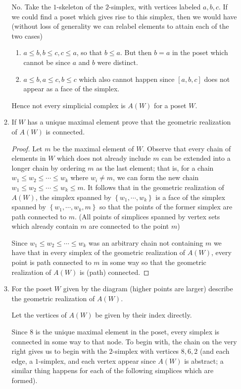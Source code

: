 \documentclass[11pt]{article}
\newcommand{\cbr}[1]{\left\{#1\right\}}
\begin{document}
\begin{enumerate}
\begin{enumerate}
        No. Take the $1$-skeleton of the $2$-simplex, with vertices labeled $a,b,c$. If we could find a poset which gives rise to this simplex, then we would have (without loss of generality we can relabel elements to attain each of the two cases) \begin{enumerate}
            \item $a\leq b, b\leq c, c\leq a $, so that $b\leq a$. But then $b = a$ in the poset which cannot be since $a$ and $b$ were distinct.
            \item $a\leq b, a\leq c, b\leq c$ which also cannot happen since $[a,b,c]$ does not appear as a face of the simplex.
        \end{enumerate} Hence not every simplicial complex is $A(W)$ for a poset $W$.
        \item If $W$ has a unique maximal element prove that the geometric realization of $A(W)$ is connected. \begin{proof}
            Let $m$ be the maximal element of $W$. Observe that every chain of elements in $W$ which does not already include $m$ can be extended into a longer chain by ordering $m$ as the last element; that is, for a chain $w_1\leq w_2\leq \cdots \leq w_k$ where $w_i\neq m$, we can form the new chain $w_1\leq w_2\leq \cdots \leq w_k\leq m$. It follows that in the geometric realization of $A(W)$, the simplex spanned by $\cbr{w_1,\cdots,w_k}$ is a face of the simplex spanned by $\cbr{w_1,\cdots,w_k,m}$ so that the points of the former simplex are path connected to $m$. (All points of simplices spanned by vertex sets which already contain $m$ are connected to the point $m$)

            Since $w_1\leq w_2\leq \cdots \leq w_k$ was an arbitrary chain not containing $m$ we have that in every simplex of the geometric realization of $A(W)$, every point is path connected to $m$ in some way so that the geometric realization of $A(W)$ is (path) connected.
        \end{proof}
        \item For the poset $W$ given by the diagram (higher points are larger) describe the geometric realization of $A(W)$. 
        
        Let the vertices of $A(W)$ be given by their index directly. 

        Since $8$ is the unique maximal element in the poset, every simplex is connected in some way to that node. To begin with, the chain on the very right gives us to begin with the $2$-simplex with vertices $8,6,2$ (and each edge, a $1$-simplex, and each vertex appear since $A(W)$ is abstract; a similar thing happens for each of the following simplices which are formed).


\end{enumerate}
\end{enumerate}
\end{document}
